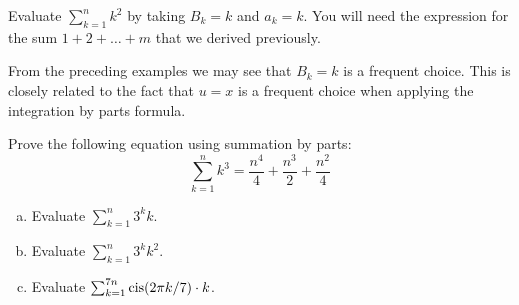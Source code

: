 \begin{exercise}{}
Evaluate $\sum_{k=1}^{n}k^{2}$ by taking $B_k=k$ and $a_k = k$. You will need the expression for the sum $1 + 2 + \ldots + m$ that we derived previously.
\end{exercise}

From the preceding examples we may see that $B_k = k$ is a frequent choice. This is closely related to the fact that $u=x$ is a frequent choice when applying  the integration by parts formula.


\begin{exercise}{}
Prove the following equation using summation by parts:
\[ \sum_{k=1}^n k^3 = \frac{n^4}{4} + \frac{n^3}{2} + \frac{n^2}{4} \]
\end{exercise}

\begin{exercise}{}
\begin{enumerate}[(a)]
\item
 Evaluate $\sum_{k=1}^{n}3^{k}k$.
\item
 Evaluate $\sum_{k=1}^{n}3^{k}k^2$.
\item
Evaluate $\sum_{k=1}^{7n} \operatorname{cis}(2\pi k/7)\cdot k$.
\end{enumerate}
\end{exercise}

